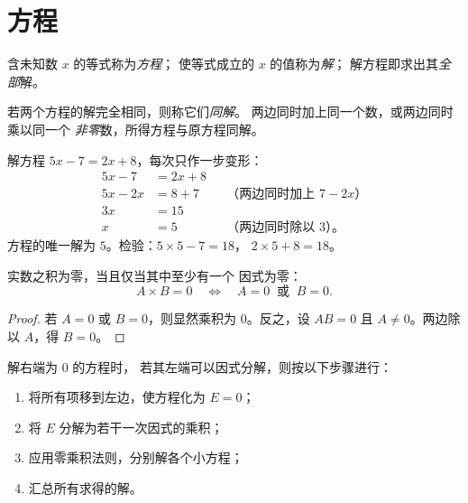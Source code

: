 \section{方程}

\begin{definition}[方程、解]\label{def:g10:algebra:equation}
含未知数 $x$ 的等式称为\emph{方程}；
使等式成立的 $x$ 的值称为\emph{解}；
解方程即求出其\emph{全部}解。
\end{definition}

若两个方程的解完全相同，则称它们\emph{同解}。
两边同时加上同一个数，或两边同时乘以同一个
\emph{非零}数，所得方程与原方程同解。

\begin{example}[一元一次方程]\label{ex:g10:algebra:firstdegree}
解方程 $5x - 7 = 2x + 8$，每次只作一步变形：
\begin{align*}
5x - 7 &= 2x + 8 \\
5x - 2x &= 8 + 7 && \text{（两边同时加上 $7 - 2x$）} \\
3x &= 15 \\
x &= 5 && \text{（两边同时除以 $3$）。}
\end{align*}
方程的唯一解为 $5$。检验：$5 \times 5 - 7 = 18$，
$2 \times 5 + 8 = 18$。
\end{example}

\begin{theorem}[零乘积法则]\label{thm:g10:algebra:zeroproduct}
实数之积为零，当且仅当其中至少有一个
因式为零：
\[
A \times B = 0
\quad\Longleftrightarrow\quad
A = 0 \ \text{ 或 } \ B = 0 .
\]
\end{theorem}

\begin{proof}
若 $A = 0$ 或 $B = 0$，则显然乘积为 $0$。反之，设
$AB = 0$ 且 $A \neq 0$。两边除以 $A$，得 $B = 0$。
\end{proof}

\begin{method}[用因式分解法解方程]\label{met:g10:algebra:zeroproduct}
解右端为 $0$ 的方程时，
若其左端可以因式分解，则按以下步骤进行：
\begin{enumerate}
  \item 将所有项移到左边，使方程化为 $E = 0$；
  \item 将 $E$ 分解为若干一次因式的乘积；
  \item 应用零乘积法则，分别解各个小方程；
  \item 汇总所有求得的解。
\end{enumerate}
\end{method}

